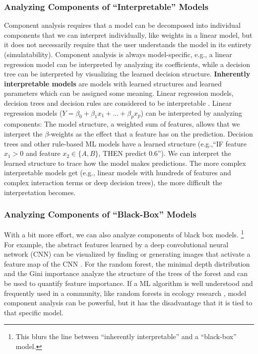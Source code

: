 \documentclass[runningheads]{llncs}
\begin{document}
\subsubsection{Analyzing Components of \enquote{Interpretable} Models}
Component analysis requires that a model can be decomposed into individual components that we can interpret individually, like weights in a linear model, but it does not necessarily require that the user understands the model in its entirety (simulatability).
Component analysis is always model-specific, e.g., a linear regression model can be interpreted by analyzing its coefficients, while a decision tree can be interpreted by visualizing the learned decision structure.
\textbf{Inherently interpretable models} are models with learned structures and learned parameters which can be assigned some meaning.
Linear regression models, decision trees and decision rules are considered to be interpretable \cite{freitas2014comprehensible,huysmans2011empirical}.
Linear regression models ($Y = \beta_0 + \beta_1 x_1 + \ldots + \beta_p x_p$) can be interpreted by analyzing components:
The model structure, a weighted sum of features, allows that we interpret the $\beta$-weights as the effect that a feature has on the prediction.
Decision trees and other rule-based ML models have a learned structure (e.g.,\enquote{IF feature $x_1 > 0$ and feature $x_2 \in \{A,B\}$, THEN predict 0.6}).
We can interpret the learned structure to trace how the model makes predictions.
The more complex interpretable models get (e.g., linear models with hundreds of features and complex interaction terms or deep decision trees), the more difficult the interpretation becomes.

\subsubsection{Analyzing Components of \enquote{Black-Box} Models}

With a bit more effort, we can also analyze components of black box models.
\footnote{This blurs the line between \enquote{inherently interpretable} and a \enquote{black-box} model.}
For example, the abstract features learned by a deep convolutional neural network (CNN) can be visualized by finding or generating images that activate a feature map of the CNN \cite{olah2017feature}.
For the random forest, the minimal depth distribution \cite{randomForestExplainer,ishwaran2010high} and the Gini importance \cite{breiman2001random} analyze the structure of the trees of the forest and can be used to quantify feature importance.
If a ML algorithm is well understood and frequently used in a community, like random forests in ecology research \cite{cutler2007random}, model component analysis can be powerful, but it has the disadvantage that it is tied to that specific model.
\end{document}
